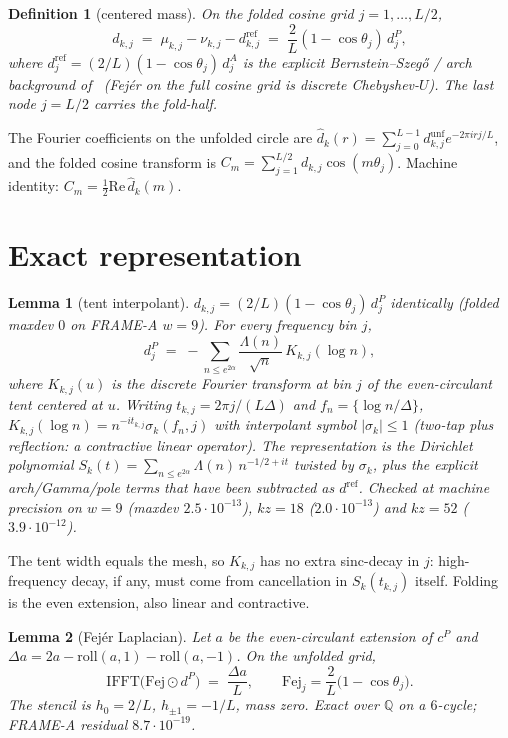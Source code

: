 \documentclass[11pt]{article}
\newtheorem{lemma}{Lemma}
\newtheorem{definition}{Definition}
\theoremstyle{remark}
\newcommand{\Q}{\mathbb{Q}}
\newcommand{\dhat}{\widehat{d}}
\newcommand{\Fej}{\mathrm{Fej}}
\begin{document}
\begin{definition}[centered mass]\label{def:d}
On the folded cosine grid $j=1,\ldots,L/2$,
\[
d_{k,j}
\;=\;
\mu_{k,j}-\nu_{k,j}-d^{\mathrm{ref}}_{k,j}
\;=\;
\frac2L(1-\cos\theta_j)\,d^P_j,
\]
where $d^{\mathrm{ref}}_j=(2/L)(1-\cos\theta_j)\,d^A_j$ is the
explicit Bernstein--Szeg\H{o} / arch background of~\cite{r390}
(Fej\'er on the full cosine grid is discrete Chebyshev-$U$).
The last node $j=L/2$ carries the fold-half.
\end{definition}

The Fourier coefficients on the unfolded circle are
$\dhat_k(r)=\sum_{j=0}^{L-1}d^{\mathrm{unf}}_{k,j}e^{-2\pi i rj/L}$,
and the folded cosine transform is
$C_m=\sum_{j=1}^{L/2}d_{k,j}\cos(m\theta_j)$.
Machine identity: $C_m=\tfrac12\mathrm{Re}\,\dhat_k(m)$.

\section{Exact representation}\label{sec:rep}

\begin{lemma}[tent interpolant]\label{lem:dcent}
$d_{k,j}=(2/L)(1-\cos\theta_j)\,d^P_j$ identically (folded
maxdev $0$ on FRAME-A $w=9$).
For every frequency bin $j$,
\[
d^P_j
\;=\;
-\sum_{n\le e^{2\alpha}}\frac{\Lambda(n)}{\sqrt n}\,K_{k,j}(\log n),
\]
where $K_{k,j}(u)$ is the discrete Fourier transform at bin
$j$ of the even-circulant tent centered at $u$.
Writing $t_{k,j}=2\pi j/(L\Delta)$ and
$f_n=\{\log n/\Delta\}$,
$K_{k,j}(\log n)=n^{-it_{k,j}}\sigma_k(f_n,j)$ with interpolant
symbol $\lvert\sigma_k\rvert\le 1$ (two-tap plus reflection:
a contractive linear operator).
The representation is the Dirichlet polynomial
$S_k(t)=\sum_{n\le e^{2\alpha}}\Lambda(n)\,n^{-1/2+it}$
twisted by $\sigma_k$, plus the explicit arch/Gamma/pole
terms that have been subtracted as $d^{\mathrm{ref}}$.
Checked at machine precision on $w=9$ (maxdev $2.5\cdot10^{-13}$),
$kz=18$ ($2.0\cdot10^{-13}$) and $kz=52$ ($3.9\cdot10^{-12}$).
\end{lemma}

The tent width equals the mesh, so $K_{k,j}$ has no extra
sinc-decay in $j$: high-frequency decay, if any, must come
from cancellation in $S_k(t_{k,j})$ itself.
Folding is the even extension, also linear and contractive.

\begin{lemma}[Fej\'er Laplacian]\label{lem:lap}
Let $a$ be the even-circulant extension of $c^P$ and
$\Delta a=2a-\mathrm{roll}(a,1)-\mathrm{roll}(a,-1)$.
On the unfolded grid,
\[
\mathrm{IFFT}\bigl(\Fej\odot d^P\bigr)
\;=\;
\frac{\Delta a}{L},
\qquad
\Fej_j=\frac2L\bigl(1-\cos\theta_j\bigr).
\]
The stencil is $h_0=2/L$, $h_{\pm1}=-1/L$, mass zero.
Exact over $\Q$ on a $6$-cycle; FRAME-A residual
$8.7\cdot10^{-19}$.
\end{lemma}
\end{document}
